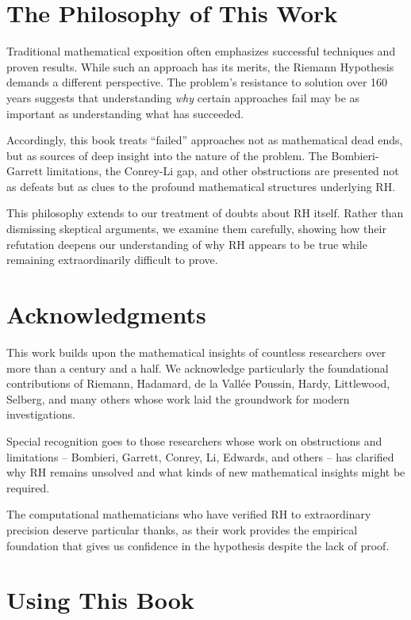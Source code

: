 \section*{The Philosophy of This Work}

Traditional mathematical exposition often emphasizes successful techniques and proven results. While such an approach has its merits, the Riemann Hypothesis demands a different perspective. The problem's resistance to solution over 160 years suggests that understanding \emph{why} certain approaches fail may be as important as understanding what has succeeded.

Accordingly, this book treats ``failed'' approaches not as mathematical dead ends, but as sources of deep insight into the nature of the problem. The Bombieri-Garrett limitations, the Conrey-Li gap, and other obstructions are presented not as defeats but as clues to the profound mathematical structures underlying RH.

This philosophy extends to our treatment of doubts about RH itself. Rather than dismissing skeptical arguments, we examine them carefully, showing how their refutation deepens our understanding of why RH appears to be true while remaining extraordinarily difficult to prove.

\section*{Acknowledgments}

This work builds upon the mathematical insights of countless researchers over more than a century and a half. We acknowledge particularly the foundational contributions of Riemann, Hadamard, de la Vall\'ee Poussin, Hardy, Littlewood, Selberg, and many others whose work laid the groundwork for modern investigations.

Special recognition goes to those researchers whose work on obstructions and limitations -- Bombieri, Garrett, Conrey, Li, Edwards, and others -- has clarified why RH remains unsolved and what kinds of new mathematical insights might be required.

The computational mathematicians who have verified RH to extraordinary precision deserve particular thanks, as their work provides the empirical foundation that gives us confidence in the hypothesis despite the lack of proof.

\section*{Using This Book}

